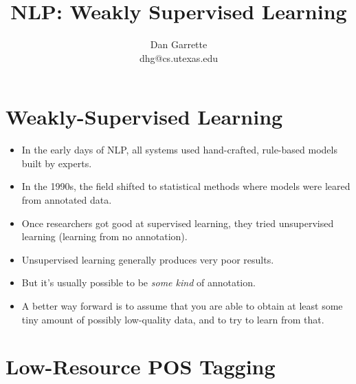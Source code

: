 \documentclass[11pt,letterpaper]{article}
\title{NLP: Weakly Supervised Learning}
\author{Dan Garrette\\\small{dhg@cs.utexas.edu}}
\begin{document}
\maketitle


\section{Weakly-Supervised Learning}

\begin{itemize}
  \item In the early days of NLP, all systems used hand-crafted, rule-based models built by experts.
  \item In the 1990s, the field shifted to statistical methods where models were leared from annotated data.
  \item Once researchers got good at supervised learning, they tried unsupervised learning (learning from no annotation).
  \item Unsupervised learning generally produces very poor results.
  \item But it's usually possible to be \textit{some kind} of annotation.
  \item A better way forward is to assume that you are able to obtain at least some tiny amount of possibly low-quality data, and to try to learn from that.
\end{itemize}


\section{Low-Resource POS Tagging}
\end{document}
